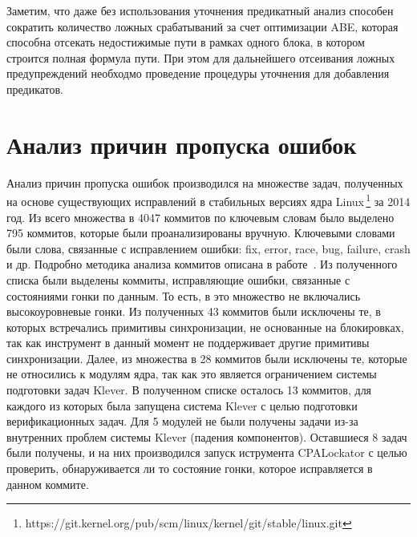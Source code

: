 Заметим, что даже без использования уточнения предикатный анализ способен сократить количество ложных срабатываний за счет оптимизации ABE, которая способна отсекать недостижимые пути в рамках одного блока, в котором строится полная формула пути.
При этом для дальнейшего отсеивания ложных предупреждений необходмо проведение процедуры уточнения для добавления предикатов.

\section{Анализ причин пропуска ошибок}

Анализ причин пропуска ошибок производился на множестве задач, полученных на основе существующих исправлений в стабильных версиях ядра Linux\,\footnote{https://git.kernel.org/pub/scm/linux/kernel/git/stable/linux.git} за 2014 год.
Из всего множества в 4047 коммитов по ключевым словам было выделено 795 коммитов, которые были проанализированы вручную.
Ключевыми словами были слова, связанные с исправлением ошибки: fix, error, race, bug, failure, crash и др. 
Подробно методика анализа коммитов описана в работе~\cite{commit_analysis_12}.
Из полученного списка были выделены коммиты, исправляющие ошибки, связанные с состояниями гонки по данным.
То есть, в это множество не включались высокоуровневые гонки.
Из полученных 43 коммитов были исключены те, в которых встречались примитивы синхронизации, не основанные на блокировках, так как инструмент в данный момент не поддерживает другие примитивы синхронизации.
Далее, из множества в 28 коммитов были исключены те, которые не относились к модулям ядра, так как это является ограничением системы подготовки задач Klever.
В полученном списке осталось 13 коммитов, для каждого из которых была запущена система Klever с целью подготовки верификационных задач.
Для 5 модулей не были получены задачи из-за внутренних проблем системы Klever (падения компонентов).
Оставшиеся 8 задач были получены, и на них производился запуск иструмента CPALockator с целью проверить, обнаруживается ли то состояние гонки, которое исправляется в данном коммите.


